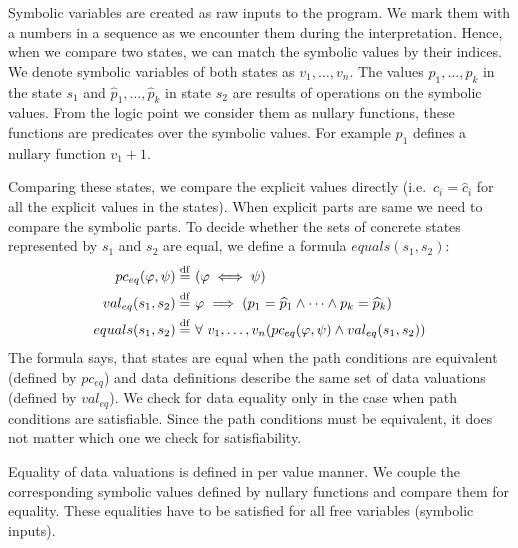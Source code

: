 Symbolic variables are created as raw inputs to the program. We mark them with a
numbers in a sequence as we encounter them during the interpretation. Hence,
when we compare two states, we can match the symbolic values by their indices. We
denote symbolic variables of both states as $v_1, \dots, v_n$. The values $p_1,
\dots, p_k$ in the state $s_1$ and $\widehat{p}_1, \dots, \widehat{p}_k$ in
state $s_2$ are results of operations on the symbolic values. From the logic
point we consider them as nullary functions, these functions are predicates over
the symbolic values. For example $p_1$ defines a nullary function $v_1 + 1$.

Comparing these states, we compare the explicit values directly (i.e.~$c_i =
\widehat{c}_i$ for all the explicit values in the states).  When explicit parts
are same we need to compare the symbolic parts. To decide whether the sets of
concrete states represented by $s_1$ and $s_2$ are equal, we define a formula
$equals(s_1, s_2)$:
\begin{equation*}
\begin{aligned}
    pc_{eq}(\varphi, \psi) \stackrel{\mathrm{df}}{=} & ~(\varphi \iff \psi) \\
    val_{eq}(s_1, s_2) \stackrel{\mathrm{df}}{=} & ~\varphi \implies (p_1 = \widehat{p}_1 \wedge \dots \wedge p_k = \widehat{p}_k ) \\
    equals(s_1, s_2) \stackrel{\mathrm{df}}{=} & ~\forall~v_1,\dots, v_n (pc_{eq}(\varphi, \psi)
    \wedge val_{eq}(s_1, s_2))
\end{aligned}
\end{equation*}
The formula says, that states are equal when the path conditions are
equivalent (defined by $pc_{eq}$) and data definitions describe the same set
of data valuations (defined by $val_{eq}$). We check for data equality only in
the case when path conditions are satisfiable. Since the path conditions must
be equivalent, it does not matter which one we check for satisfiability.

Equality of data valuations is defined in per value manner. We couple the
corresponding symbolic values defined by nullary functions and compare them for
equality. These equalities have to be satisfied for all free variables (symbolic
inputs).

